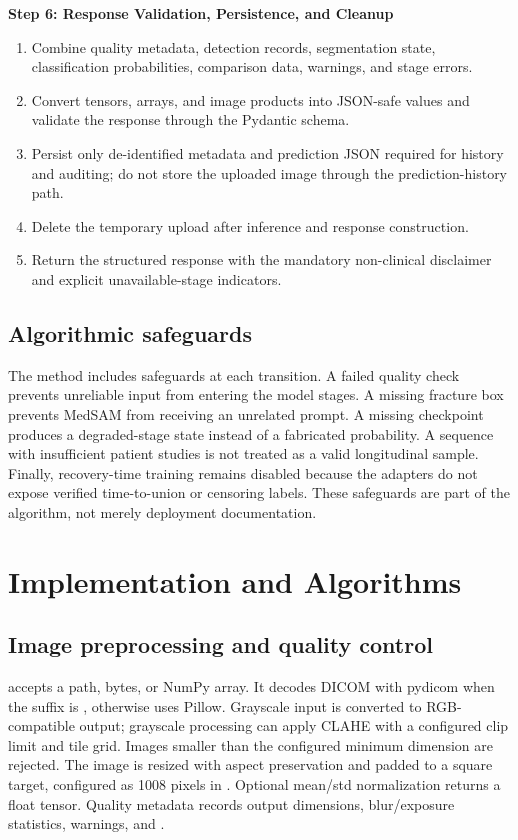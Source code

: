 \documentclass[12pt,a4paper]{article}
\newcommand{\code}[1]{\texttt{\footnotesize\detokenize{#1}}}
\begin{document}
\textbf{Step 6: Response Validation, Persistence, and Cleanup}

\begin{enumerate}[leftmargin=30pt,label=6.\arabic*]
\item Combine quality metadata, detection records, segmentation state, classification probabilities, comparison data, warnings, and stage errors.
\item Convert tensors, arrays, and image products into JSON-safe values and validate the response through the Pydantic schema.
\item Persist only de-identified metadata and prediction JSON required for history and auditing; do not store the uploaded image through the prediction-history path.
\item Delete the temporary upload after inference and response construction.
\item Return the structured response with the mandatory non-clinical disclaimer and explicit unavailable-stage indicators.
\end{enumerate}

\subsection{Algorithmic safeguards}
The method includes safeguards at each transition. A failed quality check prevents unreliable input from entering the model stages. A missing fracture box prevents MedSAM from receiving an unrelated prompt. A missing checkpoint produces a degraded-stage state instead of a fabricated probability. A sequence with insufficient patient studies is not treated as a valid longitudinal sample. Finally, recovery-time training remains disabled because the adapters do not expose verified time-to-union or censoring labels. These safeguards are part of the algorithm, not merely deployment documentation.

\clearpage
\section{Implementation and Algorithms}
\subsection{Image preprocessing and quality control}
\code{preprocess\_image} accepts a path, bytes, or NumPy array. It decodes DICOM with pydicom when the suffix is \code{.dcm}, otherwise uses Pillow. Grayscale input is converted to RGB-compatible output; grayscale processing can apply CLAHE with a configured clip limit and tile grid. Images smaller than the configured minimum dimension are rejected. The image is resized with aspect preservation and padded to a square target, configured as 1008 pixels in \code{config.yaml}. Optional mean/std normalization returns a float tensor. Quality metadata records output dimensions, blur/exposure statistics, warnings, and \code{qc\_passed}.
\end{document}

